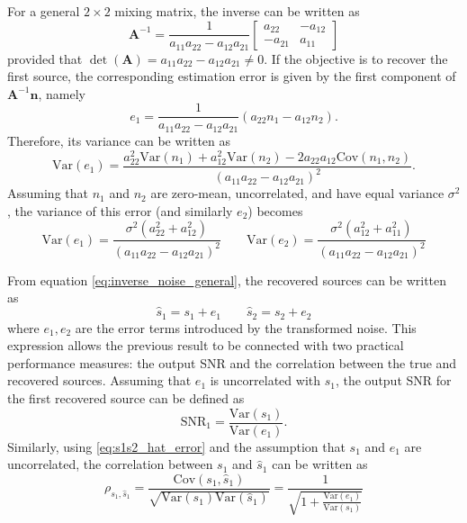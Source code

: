 For a general $2\times 2$ mixing matrix, the inverse can be written as
\begin{equation}
\mathbf{A}^{-1}
=
\frac{1}{a_{11}a_{22}-a_{12}a_{21}}
\begin{bmatrix}
a_{22} & -a_{12}\\
-a_{21} & a_{11}
\end{bmatrix}
\label{eq:inverse_A_general}
\end{equation}
provided that $\det(\mathbf{A})=a_{11}a_{22}-a_{12}a_{21}\neq 0$. 
If the objective is to recover the first source, the corresponding estimation error is given by the first component of $\mathbf{A}^{-1}\mathbf{n}$, namely
\begin{equation}
e_1=
\frac{1}{a_{11}a_{22}-a_{12}a_{21}}
\left(a_{22}n_1-a_{12}n_2\right).
\label{eq:e1_general}
\end{equation}Therefore, its variance can be written as
\begin{equation}
\mathrm{Var}(e_1)=
\frac{
a_{22}^2\mathrm{Var}(n_1)
+a_{12}^2\mathrm{Var}(n_2)
-2a_{22}a_{12}\mathrm{Cov}(n_1,n_2)
}{
\left(a_{11}a_{22}-a_{12}a_{21}\right)^2
}.
\label{eq:var_e1_expanded}
\end{equation}
Assuming that $n_1$ and $n_2$ are zero-mean, uncorrelated, and have equal variance $\sigma^2$, the variance of this error (and similarly $e_2$) becomes
\begin{equation}
\mathrm{Var}(e_1)=
\frac{\sigma^2\left(a_{22}^2+a_{12}^2\right)}
{\left(a_{11}a_{22}-a_{12}a_{21}\right)^2} \qquad
\mathrm{Var}(e_2)=
\frac{\sigma^2\left(a_{12}^2+a_{11}^2\right)}
{\left(a_{11}a_{22}-a_{12}a_{21}\right)^2}
\label{eq:var_e1_e2_general}
\end{equation}

From equation \eqref{eq:inverse_noise_general}, the recovered sources can be written as
\begin{equation}
\hat{s}_1 = s_1 + e_1 \qquad
\hat{s}_2 = s_2 + e_2
\label{eq:s1s2_hat_error}
\end{equation}
where $e_1,e_2$ are the error terms introduced by the transformed noise. This expression allows the previous result to be connected with two practical performance measures: the output SNR and the correlation between the true and recovered sources.
Assuming that $e_1$ is uncorrelated with $s_1$, the output SNR for the first recovered source can be defined as
\begin{equation}
\mathrm{SNR}_1=\frac{\mathrm{Var}(s_1)}{\mathrm{Var}(e_1)}.
\label{eq:snr1_def}
\end{equation}
Similarly, using \eqref{eq:s1s2_hat_error} and the assumption that $s_1$ and $e_1$ are uncorrelated, the correlation between $s_1$ and $\hat{s}_1$ can be written as
\begin{equation}
\rho_{s_1,\hat{s}_1}=
\frac{\mathrm{Cov}(s_1,\hat{s}_1)}
{\sqrt{\mathrm{Var}(s_1)\mathrm{Var}(\hat{s}_1)}} = \frac{1}{\sqrt{1+\frac{\mathrm{Var}(e_1)}{\mathrm{Var}(s_1)}}}
\label{eq:corr_def}
\end{equation}

